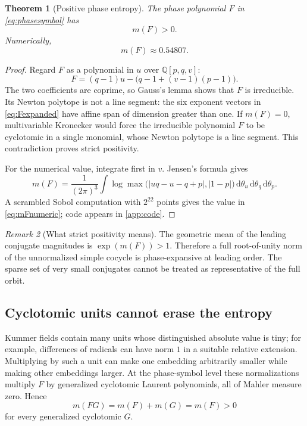 \documentclass[11pt]{article}
\newtheorem{theorem}{Theorem}[section]
\theoremstyle{definition}
\theoremstyle{remark}
\newtheorem{remark}[theorem]{Remark}
\newcommand{\Q}{\mathbb Q}
\newcommand{\dd}{\,\mathrm d}
\newcommand{\abs}[1]{\left|#1\right|}
\begin{document}
\begin{theorem}[Positive phase entropy]\label{thm:positiveMahler}
The phase polynomial $F$ in \eqref{eq:phasesymbol} has
\begin{equation}\label{eq:mFpositive}
 m(F)>0.
\end{equation}
Numerically,
\begin{equation}\label{eq:mFnumeric}
 m(F)\approx0.54807.
\end{equation}
\end{theorem}

\begin{proof}
Regard $F$ as a polynomial in $u$ over $\Q[p,q,v]$:
\[
 F=(q-1)u-\bigl(q-1+(v-1)(p-1)\bigr).
\]
The two coefficients are coprime, so Gauss's lemma shows that $F$ is irreducible.
Its Newton polytope is not a line segment: the six exponent vectors in
\eqref{eq:Fexpanded} have affine span of dimension greater than one.  If
$m(F)=0$, multivariable Kronecker would force the irreducible polynomial $F$ to
be cyclotomic in a single monomial, whose Newton polytope is a line segment.
This contradiction proves strict positivity.

For the numerical value, integrate first in $v$.  Jensen's formula gives
\begin{equation}\label{eq:mFjensen}
 m(F)=\frac1{(2\pi)^3}\int
 \log\max\bigl(\abs{uq-u-q+p},\abs{1-p}\bigr)
 \dd\theta_u\dd\theta_q\dd\theta_p.
\end{equation}
A scrambled Sobol computation with $2^{22}$ points gives the value in
\eqref{eq:mFnumeric}; code appears in \cref{app:code}.
\end{proof}

\begin{remark}[What strict positivity means]
The geometric mean of the leading conjugate magnitudes is
$\exp(m(F))>1$.  Therefore a full root-of-unity norm of the unnormalized simple
cocycle is phase-expansive at leading order.  The sparse set of very small
conjugates cannot be treated as representative of the full orbit.
\end{remark}

\subsection{Cyclotomic units cannot erase the entropy}

Kummer fields contain many units whose distinguished absolute value is tiny;
for example, differences of radicals can have norm $1$ in a suitable relative
extension.  Multiplying by such a unit can make one embedding arbitrarily
smaller while making other embeddings larger.  At the phase-symbol level these
normalizations multiply $F$ by generalized cyclotomic Laurent polynomials, all
of Mahler measure zero.  Hence
\begin{equation}\label{eq:unitinvariance}
 m(FG)=m(F)+m(G)=m(F)>0
\end{equation}
for every generalized cyclotomic $G$.
\end{document}
